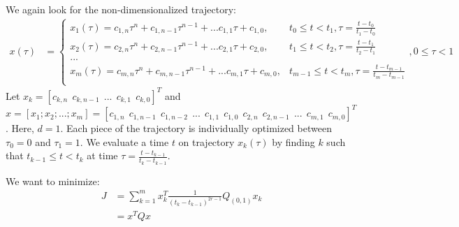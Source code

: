 \documentclass[11pt]{article}
\begin{document}
We again look for the non-dimensionalized trajectory: 
\begin{align*}
x(\tau) &= 
\begin{cases}
    x_1 (\tau) = c_{1, n} \tau^n + c_{1, n-1} \tau^{n-1} + ... c_{1, 1} \tau + c_{1, 0}, & t_0 \le t < t_1, \tau = \frac{t-t_0}{t_1-t_0}  \\
    x_2 (\tau) = c_{2, n} \tau^n + c_{2, n-1} \tau^{n-1} + ... c_{2, 1} \tau + c_{2, 0}, & t_1 \le t < t_2, \tau = \frac{t-t_1}{t_2-t_1}  \\
    ... \\
    x_m (\tau) = c_{m, n} \tau^n + c_{m, n-1} \tau^{n-1} + ... c_{m, 1} \tau + c_{m, 0}, & t_{m-1} \le t < t_m, \tau = \frac{t-t_{m-1}}{t_m-t_{m-1}} \\
\end{cases},  0 \le \tau < 1
\end{align*} 
Let $x_k = [c_{k, n} \ \ c_{k, n-1} \ \ ... \ \ c_{k, 1} \ \ c_{k, 0}]^T$ and $x = [x_1; x_2; ...; x_m] = [c_{1, n} \ \ c_{1, n-1} \ \ c_{1, n-2} \ \ ... \ \ c_{1, 1} \ \ c_{1, 0} \ \ c_{2, n} \ \ c_{2, n-1} \ \ ... \ \ c_{m, 1} \ \ c_{m, 0} ]^T$. Here, $d = 1$. Each piece of the trajectory is individually optimized between $\tau_0 = 0$ and $\tau_1=1$. We evaluate a time $t$ on trajectory $x_k(\tau)$ by finding $k$ such that $t_{k-1} \le t < t_k$ at time $\tau = \frac{t-t_{k-1}}{t_k-t_{k-1}}$.  

\mbox{} \newline
We want to minimize:
\begin{align*}
J &=  \sum_{k=1}^{m} x_k^T \frac{1}{(t_k-t_{k-1})^{2r-1}} Q_{(0, 1)} x_k \\
&= x^T Q x
\end{align*}




%
\end{document}
